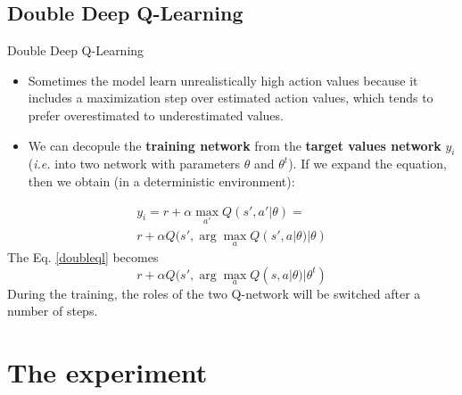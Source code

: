 \documentclass{beamer}
\begin{document}
\subsection{Double Deep Q-Learning}
\begin{frame}{Double Deep Q-Learning}
	\begin{itemize}
	\item Sometimes the model learn unrealistically high action values because it includes a maximization step over estimated action values, which tends to prefer overestimated to underestimated values. 
	\item We can decopule the \textbf{training network} from the \textbf{target values network} $y_i$ (\textit{i.e.} into two network with parameters $\theta$ and $\theta^t $). If we expand the equation, then we obtain (in a deterministic environment):
	\end{itemize}

	\begin{equation}
	\label{doubleql}
	\begin{aligned}
	y_i =  r + \alpha \max_{a'} Q(s', a'|\theta) = \\
	r + \alpha Q(s', \arg \max_a Q(s', a|\theta)  |\theta)
	\end{aligned}
	\end{equation}
	The Eq. \ref{doubleql} becomes
	\begin{equation}
	r + \alpha Q(s', \arg \max_a Q(s, a|\theta)  |\theta^t)
	\end{equation}
	During the training, the roles of the two Q-network will be switched after a number of steps. 
\end{frame}

\section{The experiment}
\end{document}
